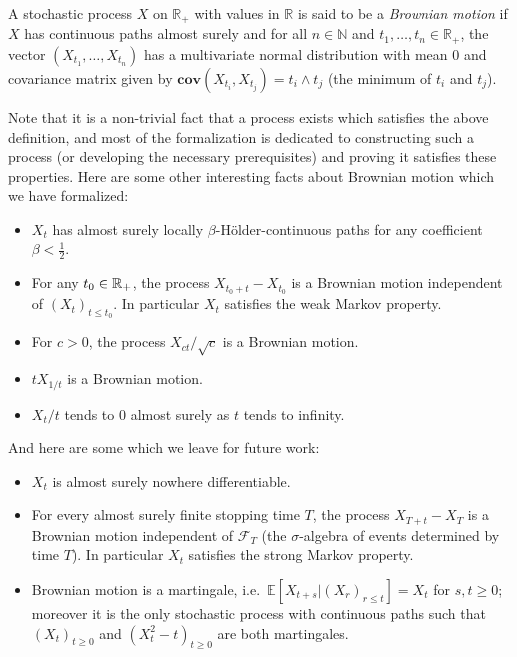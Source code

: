 \documentclass[lean]{Draft}
\makeatletter
\newcommand\leanlink{\begingroup\catcode`\#=12\relax\@leanlink}
\newcommand\@leanlink[2]{\endgroup
\href{#1}
{\texttt{\detokenize{#2}}}}
\newcommand{\mllink}[3]{%
\leanlink{https://github.com/leanprover-community/mathlib4/blob/6135ffb78e8bcd3fcc8ec02f3f82ea0b0737358b/Mathlib/#1.lean\##2}
{#3}}
\makeatother
\begin{document}
\begin{definition}[\mllink{Probability/BrownianMotion/Basic}{L300-L304}{ProbabilityTheory.IsBrownianReal}]\label{def:IsBrownian_preview}
A stochastic process $X$ on $\mathbb{R}_+$ with values in $\mathbb{R}$ is said to be a \emph{Brownian motion} if $X$ has continuous paths almost surely and for all $n \in \mathbb{N}$ and $t_1, \ldots, t_n \in \mathbb{R}_+$, the vector $(X_{t_1}, \ldots, X_{t_n})$ has a multivariate normal distribution with mean $0$ and covariance matrix given by $\mathbf{cov}(X_{t_i}, X_{t_j}) = t_i \wedge t_j$ (the minimum of $t_i$ and $t_j$).
\end{definition}
Note that it is a non-trivial fact that a process exists which satisfies the above definition, and most of the formalization is dedicated to constructing such a process (or developing the necessary prerequisites)
and proving it satisfies these properties. Here are some other interesting facts about Brownian motion which we have formalized:
\begin{itemize}
\item $X_t$ has almost surely locally $\beta$-Hölder-continuous paths for any coefficient $\beta < \tfrac 12$.
\item For any $t_0 \in \mathbb{R}_+$, the process $X_{t_0 + t} - X_{t_0}$ is a Brownian motion independent of ${(X_t)}_{t \leq t_0}$. In particular $X_t$ satisfies the weak Markov property.
\item For $c > 0$, the process $X_{ct}/\sqrt{c}$ is a Brownian motion.
\item $tX_{1/t}$ is a Brownian motion.
\item $X_t/t$ tends to $0$ almost surely as $t$ tends to infinity.
\end{itemize}
And here are some which we leave for future work:
\begin{itemize}
\item $X_t$ is almost surely nowhere differentiable.
\item For every almost surely finite stopping time $T$, the process $X_{T + t} - X_{T}$ is a Brownian motion independent of $\mathcal{F}_T$ (the $\sigma$-algebra of events determined by time $T$). In particular $X_t$ satisfies the strong Markov property.
\item Brownian motion is a martingale, i.e.\ $\mathbb E[X_{t+s} | (X_r)_{r\leq t}] = X_t$ for $s,t \geq 0$; moreover it is the only stochastic process with continuous paths such that $(X_t)_{t\geq 0}$ and $(X_t^2 - t)_{t\geq 0}$ are both martingales.
\end{itemize}
\end{document}
